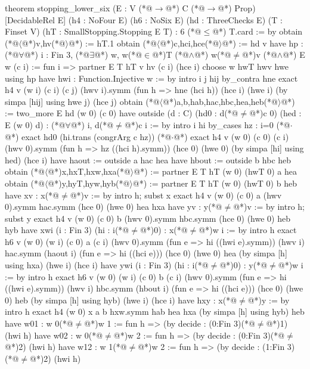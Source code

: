 theorem stopping_lower_six (E : V (*@$\to$@*) C (*@$\to$@*) Prop) [DecidableRel E]
    (h4 : NoFour E) (h6 : NoSix E) (hd : ThreeChecks E)
    (T : Finset V) (hT : SmallStopping.Stopping E T) : 6 (*@$\le$@*) T.card := by
  obtain (*@$\langle$@*)v,hv(*@$\rangle$@*) := hT.1
  obtain (*@$\langle$@*)c,hci,hce(*@$\rangle$@*) := hd v
  have hp : (*@$\forall$@*) i : Fin 3, (*@$\exists$@*) w, w(*@$\in$@*)T (*@$\land$@*) w(*@$\ne$@*)v (*@$\land$@*) E w (c i) :=
    fun i => partner E T hT v hv (c i) (hce i)
  choose w hwT hwv hwe using hp
  have hwi : Function.Injective w := by
    intro i j hij
    by_contra hne
    exact h4 v (w i) (c i) (c j) (hwv i).symm
      (fun h => hne (hci h)) (hce i) (hwe i) (by simpa [hij] using hwe j) (hce j)
  obtain (*@$\langle$@*)a,b,hab,hac,hbc,hea,heb(*@$\rangle$@*) := two_more E hd (w 0) (c 0)
  have outside (d : C) (hd0 : d(*@$\ne$@*)c 0) (hed : E (w 0) d) : (*@$\forall$@*) i, d(*@$\ne$@*)c i := by
    intro i hi
    by_cases hz : i=0
    (*@$\cdot$@*) exact hd0 (hi.trans (congrArg c hz))
    (*@$\cdot$@*) exact h4 v (w 0) (c 0) (c i) (hwv 0).symm
        (fun h => hz ((hci h).symm)) (hce 0) (hwe 0) (by simpa [hi] using hed) (hce i)
  have haout := outside a hac hea
  have hbout := outside b hbc heb
  obtain (*@$\langle$@*)x,hxT,hxw,hxa(*@$\rangle$@*) := partner E T hT (w 0) (hwT 0) a hea
  obtain (*@$\langle$@*)y,hyT,hyw,hyb(*@$\rangle$@*) := partner E T hT (w 0) (hwT 0) b heb
  have xv : x(*@$\ne$@*)v := by
    intro h; subst x
    exact h4 v (w 0) (c 0) a (hwv 0).symm hac.symm (hce 0) (hwe 0) hea hxa
  have yv : y(*@$\ne$@*)v := by
    intro h; subst y
    exact h4 v (w 0) (c 0) b (hwv 0).symm hbc.symm (hce 0) (hwe 0) heb hyb
  have xwi (i : Fin 3) (hi : i(*@$\ne$@*)0) : x(*@$\ne$@*)w i := by
    intro h
    exact h6 v (w 0) (w i) (c 0) a (c i)
      (hwv 0).symm (fun e => hi ((hwi e).symm)) (hwv i)
      hac.symm (haout i) (fun e => hi ((hci e)))
      (hce 0) (hwe 0) hea (by simpa [h] using hxa) (hwe i) (hce i)
  have ywi (i : Fin 3) (hi : i(*@$\ne$@*)0) : y(*@$\ne$@*)w i := by
    intro h
    exact h6 v (w 0) (w i) (c 0) b (c i)
      (hwv 0).symm (fun e => hi ((hwi e).symm)) (hwv i)
      hbc.symm (hbout i) (fun e => hi ((hci e)))
      (hce 0) (hwe 0) heb (by simpa [h] using hyb) (hwe i) (hce i)
  have hxy : x(*@$\ne$@*)y := by
    intro h
    exact h4 (w 0) x a b hxw.symm hab hea hxa (by simpa [h] using hyb) heb
  have w01 : w 0(*@$\ne$@*)w 1 := fun h => (by decide : (0:Fin 3)(*@$\ne$@*)1) (hwi h)
  have w02 : w 0(*@$\ne$@*)w 2 := fun h => (by decide : (0:Fin 3)(*@$\ne$@*)2) (hwi h)
  have w12 : w 1(*@$\ne$@*)w 2 := fun h => (by decide : (1:Fin 3)(*@$\ne$@*)2) (hwi h)
